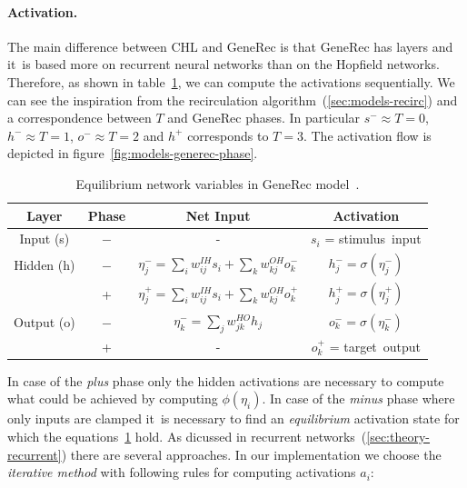 \paragraph{Activation.} 
\label{sec:models-generec-activation} 
The main difference between CHL and GeneRec is that GeneRec has layers and it~is based more on recurrent neural networks than on the Hopfield networks. Therefore, as shown in table~\ref{tab:models-generec}, we can compute the activations sequentially. We can see the inspiration from the recirculation algorithm~(\ref{sec:models-recirc}) and a correspondence between $T$ and GeneRec phases. In particular $s^{-} \approx T=0$, $h^{-} \approx T=1$, $o^{-} \approx T=2$ and $h^{+}$ corresponds to $T=3$. The activation flow is depicted in figure~\ref{fig:models-generec-phase}.
\begin{table}[H]
  \centering
  \begin{tabular}{|cccc|}
    \hline
    Layer & Phase & Net Input & Activation\\
    \hline
    Input (s)    & $-$ & - & $s_i$ = \mbox{stimulus input} \\
    \hline
    Hidden (h)   & $-$ & \hspace{0.3cm}$\eta^{-}_j = \sum_i w_{ij}^{IH}s_i + \sum_k w_{kj}^{OH}o^{-}_k$\hspace{0.3cm} &
    $h^{-}_j = \sigma(\eta^{-}_j)$\hspace{0.3cm}\\
          &  +  & $\eta^{+}_j = \sum_{i}w_{ij}^{IH}s_i + \sum_k w_{kj}^{OH}o^{+}_k$ & $h^{+}_{j} = \sigma(\eta^{+}_j)$ \\
    \hline
    Output (o) & $-$ & $\eta^{-}_k = \sum_j w_{jk}^{HO}h_j$ & $o^{-}_k = \sigma(\eta^{-}_k)$\\
           &  +  & - & $o^{+}_k$ = \mbox{target output} \\
    \hline
  \end{tabular}
  \caption{Equilibrium network variables in GeneRec model~\citet{o1996bio}.}
  \label{tab:models-generec}
\end{table}
In case of the \emph{plus} phase only the hidden activations are necessary to compute what could be achieved by computing $\phi(\eta_i)$. In case of the \emph{minus} phase where only inputs are clamped it~is necessary to find an \emph{equilibrium} activation state for which the equations~\ref{tab:models-generec} hold. As dicussed in recurrent networks~(\ref{sec:theory-recurrent}) there are several approaches. In our implementation we choose the \emph{iterative method} with following rules for computing activations $a_i$: 
